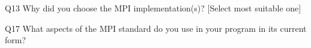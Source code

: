 \begin{description}%
\item{Q13} Why did you choose the MPI implementation(s)? [Select most suitable one]%
\item{Q17} What aspects of the MPI standard do you use in your program in its current form?%
\end{description}%

